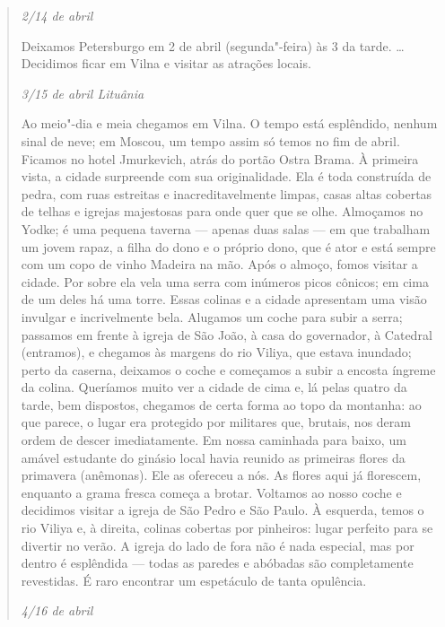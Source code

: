 \begin{quote}
\textit{2/14 de abril}

Deixamos Petersburgo em 2 de abril (segunda"-feira) às 3 da tarde.
\ldots{} Decidimos ficar em Vilna e visitar as atrações locais.

\medskip

\textit{3/15 de abril Lituânia}

Ao meio"-dia e meia chegamos em Vilna. O tempo está esplêndido, nenhum
sinal de neve; em Moscou, um tempo assim só temos no fim de abril.
Ficamos no hotel Jmurkevich, atrás do portão Ostra Brama. À primeira
vista, a cidade surpreende com sua originalidade. Ela é toda construída
de pedra, com ruas estreitas e inacreditavelmente limpas, casas altas
cobertas de telhas e igrejas majestosas para onde quer que se olhe.
Almoçamos no Yodke; é uma pequena taverna --- apenas duas salas --- em que
trabalham um jovem rapaz, a filha do dono e o próprio dono, que é ator e
está sempre com um copo de vinho Madeira na mão. Após o almoço, fomos
visitar a cidade. Por sobre ela vela uma serra com inúmeros picos
cônicos; em cima de um deles há uma torre. Essas colinas e a cidade
apresentam uma visão invulgar e incrivelmente bela. Alugamos um coche
para subir a serra; passamos em frente à igreja de São João, à casa do
governador, à Catedral (entramos), e chegamos às margens do rio Viliya,
que estava inundado; perto da caserna, deixamos o coche e começamos a
subir a encosta íngreme da colina. Queríamos muito ver a cidade de cima
e, lá pelas quatro da tarde, bem dispostos, chegamos de certa forma ao
topo da montanha: ao que parece, o lugar era protegido por militares
que, brutais, nos deram ordem de descer imediatamente. Em nossa
caminhada para baixo, um amável estudante do ginásio local havia reunido
as primeiras flores da primavera (anêmonas). Ele as ofereceu a nós. As
flores aqui já florescem, enquanto a grama fresca começa a brotar.
Voltamos ao nosso coche e decidimos visitar a igreja de São Pedro e São
Paulo. À esquerda, temos o rio Viliya e, à direita, colinas cobertas por
pinheiros: lugar perfeito para se divertir no verão. A igreja do lado de
fora não é nada especial, mas por dentro é esplêndida --- todas as paredes
e abóbadas são completamente revestidas. É raro encontrar um espetáculo
de tanta opulência.

\medskip
\textit{4/16 de abril}


\end{quote}
